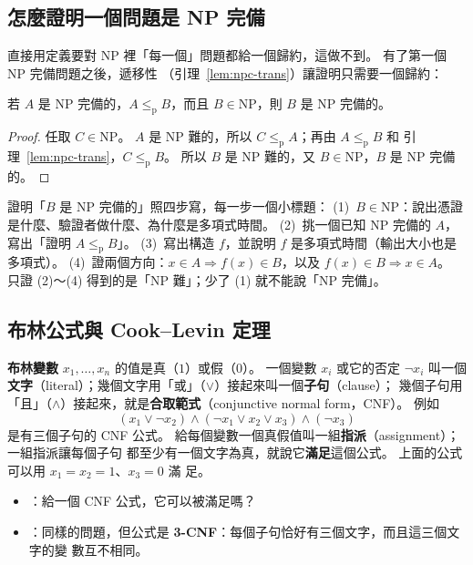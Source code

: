 \subsection{怎麼證明一個問題是 NP 完備}

直接用定義要對 NP 裡「每一個」問題都給一個歸約，這做不到。 有了第一個 NP 完備問題之後，遞移性
（引理~\ref{lem:npc-trans}）讓證明只需要一個歸約：

\begin{lemma}
\label{lem:npc-recipe}
若 $A$ 是 NP 完備的，$A \le_{\mathrm{p}} B$，而且 $B \in \mathrm{NP}$，則 $B$ 是 NP 完備的。
\end{lemma}

\begin{proof}
任取 $C \in \mathrm{NP}$。 $A$ 是 NP 難的，所以 $C \le_{\mathrm{p}} A$；再由 $A \le_{\mathrm{p}} B$ 和
引理~\ref{lem:npc-trans}，$C \le_{\mathrm{p}} B$。 所以 $B$ 是 NP 難的，又 $B \in \mathrm{NP}$，$B$ 是
NP 完備的。
\end{proof}

\begin{examnote}
證明「$B$ 是 NP 完備的」照四步寫，每一步一個小標題：
(1)~$B \in \mathrm{NP}$：說出憑證是什麼、驗證者做什麼、為什麼是多項式時間。
(2)~挑一個已知 NP 完備的 $A$，寫出「證明 $A \le_{\mathrm{p}} B$」。
(3)~寫出構造 $f$，並說明 $f$ 是多項式時間（輸出大小也是多項式）。
(4)~證兩個方向：$x \in A \Rightarrow f(x) \in B$，以及 $f(x) \in B \Rightarrow x \in A$。
只證 (2)～(4) 得到的是「NP 難」；少了 (1) 就不能說「NP 完備」。
\end{examnote}

\subsection{布林公式與 Cook--Levin 定理}

\textbf{布林變數} $x_1, \ldots, x_n$ 的值是真（$1$）或假（$0$）。 一個變數 $x_i$ 或它的否定
$\neg x_i$ 叫一個\textbf{文字}（literal）；幾個文字用「或」（$\vee$）接起來叫一個\textbf{子句}（clause）；
幾個子句用「且」（$\wedge$）接起來，就是\textbf{合取範式}（conjunctive normal form，CNF）。 例如
\[
(x_1 \vee \neg x_2) \wedge (\neg x_1 \vee x_2 \vee x_3) \wedge (\neg x_3)
\]
是有三個子句的 CNF 公式。 給每個變數一個真假值叫一組\textbf{指派}（assignment）；一組指派讓每個子句
都至少有一個文字為真，就說它\textbf{滿足}這個公式。 上面的公式可以用 $x_1 = x_2 = 1$、$x_3 = 0$ 滿
足。

\begin{itemize}
\item {}：給一個 CNF 公式，它可以被滿足嗎？
\item {}：同樣的問題，但公式是 \textbf{3-CNF}：每個子句恰好有三個文字，而且這三個文字的變
數互不相同。
\end{itemize}


